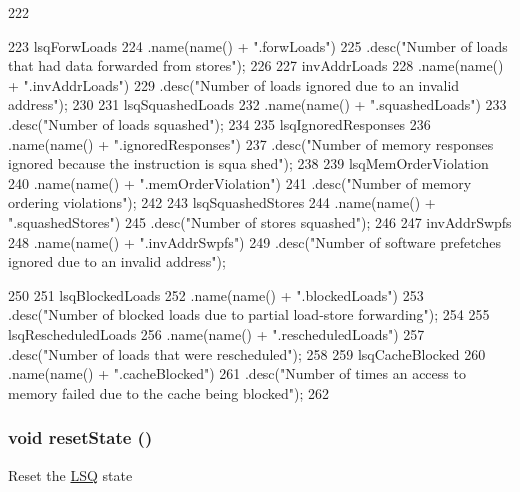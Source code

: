 \begin{DoxyCode}
222 {
223     lsqForwLoads
224         .name(name() + ".forwLoads")
225         .desc("Number of loads that had data forwarded from stores");
226 
227     invAddrLoads
228         .name(name() + ".invAddrLoads")
229         .desc("Number of loads ignored due to an invalid address");
230 
231     lsqSquashedLoads
232         .name(name() + ".squashedLoads")
233         .desc("Number of loads squashed");
234 
235     lsqIgnoredResponses
236         .name(name() + ".ignoredResponses")
237         .desc("Number of memory responses ignored because the instruction is squa
      shed");
238 
239     lsqMemOrderViolation
240         .name(name() + ".memOrderViolation")
241         .desc("Number of memory ordering violations");
242 
243     lsqSquashedStores
244         .name(name() + ".squashedStores")
245         .desc("Number of stores squashed");
246 
247     invAddrSwpfs
248         .name(name() + ".invAddrSwpfs")
249         .desc("Number of software prefetches ignored due to an invalid address");
      
250 
251     lsqBlockedLoads
252         .name(name() + ".blockedLoads")
253         .desc("Number of blocked loads due to partial load-store forwarding");
254 
255     lsqRescheduledLoads
256         .name(name() + ".rescheduledLoads")
257         .desc("Number of loads that were rescheduled");
258 
259     lsqCacheBlocked
260         .name(name() + ".cacheBlocked")
261         .desc("Number of times an access to memory failed due to the cache being 
      blocked");
262 }
\end{DoxyCode}
\hypertarget{classLSQUnit_a755ee993c2d4e9d422c37990b15afa37}{
\subsubsection[{resetState}]{\setlength{\rightskip}{0pt plus 5cm}void resetState ()}}
\label{classLSQUnit_a755ee993c2d4e9d422c37990b15afa37}
Reset the \hyperlink{classLSQ}{LSQ} state 


